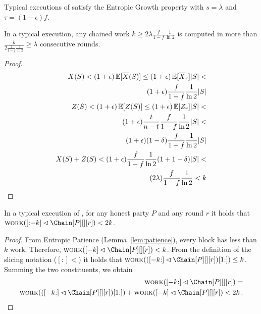 
\begin{theorem} \label{thm:entropic-growth} 
  Typical executions of \poem satisfy the Entropic Growth property
  with $s = \lambda$ and $\tau = (1 - \epsilon)f$.
\end{theorem}

\begin{conjecture} \label{lem:patience}
  In a typical execution, any chained work $k \geq 2 \lambda \frac{f}{1 - f} \frac{1}{\ln2}$ is computed
  in more than $\frac{k}{2 \frac{f}{1 - f} \frac{1}{\ln2}} \geq \lambda$ consecutive rounds.
\end{conjecture}
\begin{proof}
  \begin{align*}
    X(S) < (1 + \epsilon) \mathop{{}\mathbb{E}}[\overline{X}(S)] \leq (1 + \epsilon) \mathop{{}\mathbb{E}}[\overline{X}_r] |S| <\\
    (1 + \epsilon) \frac{f}{1 - f} \frac{1}{\ln2} |S|\\
    Z(S) < (1 + \epsilon) \mathop{{}\mathbb{E}}[Z(S)] \leq (1 + \epsilon) \mathop{{}\mathbb{E}}[Z_r] |S| <\\
    (1 + \epsilon) \frac{t}{n - t} \frac{f}{1 - f}\frac{1}{\ln2} |S| <\\
    (1 + \epsilon) (1 - \delta) \frac{f}{1 - f}\frac{1}{\ln2} |S|\\
    X(S) + Z(S) < (1 + \epsilon) \frac{f}{1 - f} \frac{1}{\ln2} (1 + 1 - \delta) |S| <\\
    (2\lambda) \frac{f}{1 - f} \frac{1}{\ln2} < k
  \end{align*}
\end{proof}

\begin{corollary} \label{cor:slicing-work-bound}
  In a typical execution of \poem, for any honest party $P$ and any round $r$ it holds that
  $\work([{:}{-k}] \lhd \Chain[P][][r]) < 2k$.
\end{corollary}
\begin{proof}
  From Entropic Patience (Lemma~\ref{lem:patience}), every block has less than $k$ work. Therefore,
  $\work([-k] \lhd \Chain[P][][r]) < k$.
  From the definition of the slicing notation ($[{:}]\lhd$)
  it holds that $\work(([-k{:}] \lhd \Chain[P][][r])[1{:}]) \leq k$. Summing the two constituents,
  we obtain
  \begin{align*}
    \work([-k{:}] \lhd \Chain[P][][r]) =\\
    \work(([-k{:}] \lhd \Chain[P][][r])[1{:}]) + \work([-k] \lhd \Chain[P][][r]) < 2k\,.
  \end{align*}
  \Qed
\end{proof}

